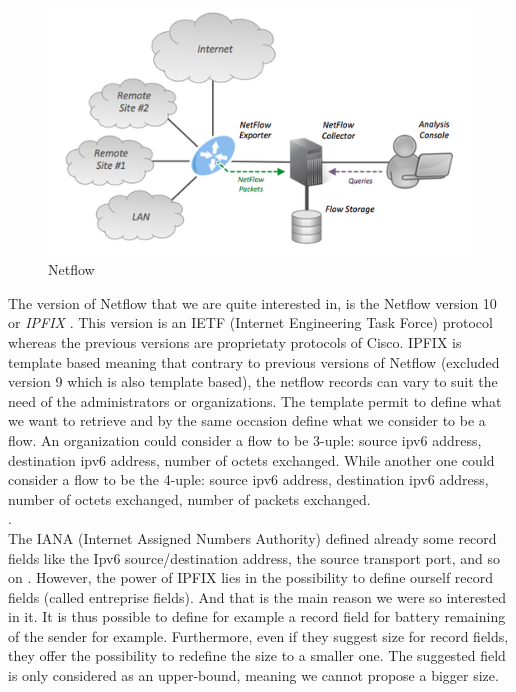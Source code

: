 \begin{figure}
  \centering
  \includegraphics[width=\textwidth]{res/netflow.png}
  \caption{Netflow}
  \label{fig:netflow}
\end{figure}

The version of Netflow that we are quite interested in, is the Netflow version 10 or \textit{IPFIX} \cite{claise2013rfc}. This version is an IETF (Internet Engineering Task Force) protocol whereas the previous versions are proprietaty protocols of Cisco. IPFIX is template based meaning that contrary to previous versions of Netflow (excluded version 9 which is also template based), the netflow records can vary to suit the need of the administrators or organizations. The template permit to define what we want to retrieve and by the same occasion define what we consider to be a flow. An organization could consider a flow to be 3-uple: source ipv6 address, destination ipv6 address, number of octets exchanged. While another one could consider a flow to be the 4-uple: source ipv6 address, destination ipv6 address, number of octets exchanged, number of packets exchanged. \\

.\\
The IANA (Internet Assigned Numbers Authority) defined already some record fields like the Ipv6 source/destination address, the source transport port, and so on \cite{website:ipfix_entities}. However, the power of IPFIX lies in the possibility to define ourself record fields (called entreprise fields). And that is the main reason we were so interested in it. It is thus possible to define for example a record field for battery remaining of the sender for example. Furthermore, even if they suggest size for record fields, they offer the possibility to redefine the size to a smaller one. The suggested field is only considered as an upper-bound, meaning we cannot propose a bigger size.\\

